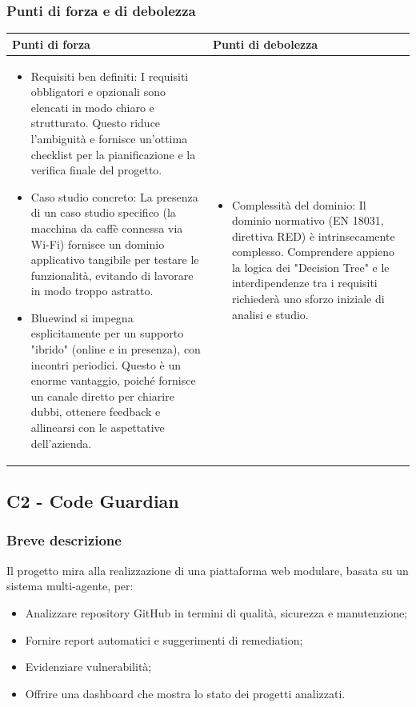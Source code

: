 \documentclass[a4paper,11pt]{article}
\begin{document}
\subsubsection{Punti di forza e di debolezza}
{\footnotesize
\begin{tabularx}{\textwidth}{|X|X|}
\hline
\rowcolor{lightgray!40} %
\textbf{Punti di forza} & \textbf{Punti di debolezza} \\
\hline
\begin{itemize}
\item Requisiti ben definiti: I requisiti obbligatori e opzionali sono elencati in modo chiaro e strutturato. Questo riduce l'ambiguità e fornisce un'ottima checklist per la pianificazione e la verifica finale del progetto.
\item Caso studio concreto: La presenza di un caso studio specifico (la macchina da caffè connessa via Wi-Fi) fornisce un dominio applicativo tangibile per testare le funzionalità, evitando di lavorare in modo troppo astratto.

\item Bluewind si impegna esplicitamente per un supporto "ibrido" (online e in presenza), con incontri periodici. Questo è un enorme vantaggio, poiché fornisce un canale diretto per chiarire dubbi, ottenere feedback e allinearsi con le aspettative dell'azienda.

\end{itemize}
 & \begin{itemize}
\item Complessità del dominio: Il dominio normativo (EN 18031, direttiva RED) è intrinsecamente complesso. Comprendere appieno la logica dei "Decision Tree" e le interdipendenze tra i requisiti richiederà uno sforzo iniziale di analisi e studio.
\end{itemize} \\
\hline
\end{tabularx}
}

\subsection{C2 - Code Guardian}
\subsubsection{Breve descrizione}
Il progetto mira alla realizzazione di una piattaforma web modulare, basata su un sistema multi-agente, per:

\begin{itemize}[leftmargin=*]
    \item Analizzare repository GitHub in termini di qualità, sicurezza e manutenzione;
    \item Fornire report automatici e suggerimenti di remediation;
    \item Evidenziare vulnerabilità;
    \item Offrire una dashboard che mostra lo stato dei progetti analizzati.
\end{itemize}
\end{document}
